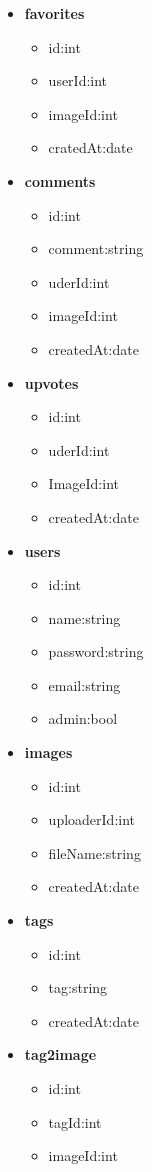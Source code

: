 \documentclass[12pt, oneside, a4paper]{article}		%
\begin{document}
\begin{itemize}
	\item \textbf{favorites}
	\begin{itemize}
		\item id:int
		\item userId:int
		\item imageId:int
		\item cratedAt:date
	\end{itemize}
	\item \textbf{comments}
	\begin{itemize}
		\item id:int
		\item comment:string
		\item uderId:int
		\item imageId:int
		\item createdAt:date
	\end{itemize}
	\item \textbf{upvotes}
	\begin{itemize}
		\item id:int
		\item uderId:int
		\item ImageId:int
		\item createdAt:date
	\end{itemize}
	\item \textbf{users}
	\begin{itemize}
		\item id:int
		\item name:string
		\item password:string
		\item email:string
		\item admin:bool
	\end{itemize}
	\item \textbf{images}
	\begin{itemize}
		\item id:int
		\item uploaderId:int
		\item fileName:string
		\item createdAt:date
	\end{itemize}
	\item \textbf{tags}
	\begin{itemize}
		\item id:int
		\item tag:string
		\item createdAt:date
	\end{itemize}
	\item \textbf{tag2image}
	\begin{itemize}
		\item id:int
		\item tagId:int
		\item imageId:int
	\end{itemize}
\end{itemize}
\end{document}
